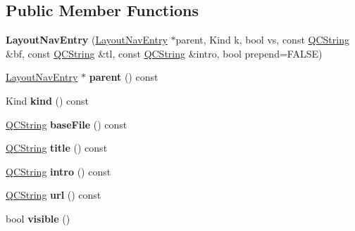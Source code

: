 \subsection*{Public Member Functions}
\begin{DoxyCompactItemize}
\item 
\mbox{\label{struct_layout_nav_entry_a03d5b37b6adad3a11d42164cd39fd58f}} 
{\bfseries Layout\+Nav\+Entry} (\mbox{\hyperlink{struct_layout_nav_entry}{Layout\+Nav\+Entry}} $\ast$parent, Kind k, bool vs, const \mbox{\hyperlink{class_q_c_string}{Q\+C\+String}} \&bf, const \mbox{\hyperlink{class_q_c_string}{Q\+C\+String}} \&tl, const \mbox{\hyperlink{class_q_c_string}{Q\+C\+String}} \&intro, bool prepend=F\+A\+L\+SE)
\item 
\mbox{\label{struct_layout_nav_entry_a2e3de33177e988b5f411c6660135baa0}} 
\mbox{\hyperlink{struct_layout_nav_entry}{Layout\+Nav\+Entry}} $\ast$ {\bfseries parent} () const
\item 
\mbox{\label{struct_layout_nav_entry_abc02648d40526f9a5675f78aac5f2773}} 
Kind {\bfseries kind} () const
\item 
\mbox{\label{struct_layout_nav_entry_ab16c1e7918e22efc6c62837a0e37551d}} 
\mbox{\hyperlink{class_q_c_string}{Q\+C\+String}} {\bfseries base\+File} () const
\item 
\mbox{\label{struct_layout_nav_entry_a006dfaa93d3dee670dd4ae22d28a1db7}} 
\mbox{\hyperlink{class_q_c_string}{Q\+C\+String}} {\bfseries title} () const
\item 
\mbox{\label{struct_layout_nav_entry_aa298e94a9e75f9d394fd7a1121f89d84}} 
\mbox{\hyperlink{class_q_c_string}{Q\+C\+String}} {\bfseries intro} () const
\item 
\mbox{\label{struct_layout_nav_entry_a1c873f2a034fd33d3c1ddcfcd0c2ecf0}} 
\mbox{\hyperlink{class_q_c_string}{Q\+C\+String}} {\bfseries url} () const
\item 
\mbox{\label{struct_layout_nav_entry_a14dabfdf60d47142677768a4b0735214}} 
bool {\bfseries visible} ()

\end{DoxyCompactItemize}
